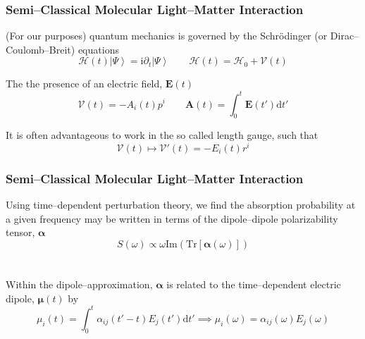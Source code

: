 \documentclass{beamer}
\newcommand{\ket}[1]{\left \vert #1 \right \rangle}
\begin{document}
\begin{frame}
\frametitle{Semi--Classical Molecular Light--Matter Interaction}

(For our purposes) quantum mechanics is governed by the Schr\"{o}dinger (or Dirac--Coulomb--Breit)
equations
\begin{equation*}
\mathcal{H}(t)\ket{\Psi} = \mathrm{i}\partial_t\ket{\Psi} \qquad \mathcal{H}(t) = \mathcal{H}_0 + \mathcal{V}(t)
\end{equation*}

The the presence of an electric field, $\mathbf{E}(t)$
\begin{equation*}
\mathcal{V}(t) = -A_i(t) p^i \qquad \mathbf{A}(t) = \int_{0}^t \mathbf{E}(t') \mathrm{d}t'
\end{equation*}

It is often advantageous to work in the so called length gauge, such that
\begin{equation*}
\mathcal{V}(t) \mapsto \mathcal{V}'(t) = - E_i(t) r^i
\end{equation*}

\end{frame}

\begin{frame}
\frametitle{Semi--Classical Molecular Light--Matter Interaction}

Using time--dependent perturbation theory, we find the absorption probability at a given
frequency may be written in terms of the dipole--dipole polarizability tensor, $\boldsymbol{\alpha}$
\begin{equation*}
S(\omega) \propto \omega \mathrm{Im}\left(\mathrm{Tr}[\boldsymbol{\alpha}(\omega)]\right)
\end{equation*}
~\\
~\\
Within the dipole--approximation, $\boldsymbol{\alpha}$ is related to the 
time--dependent electric dipole, $\boldsymbol{\mu}(t)$ by
\begin{equation*}
\mu_i(t) = \int_0^t \alpha_{ij}(t' -t) E_j(t') \mathrm{d}t' \implies \mu_i(\omega) = \alpha_{ij}(\omega) E_j(\omega)
\end{equation*}

\end{frame}
\end{document}
